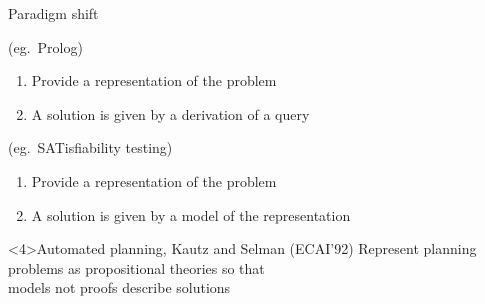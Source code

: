\begin{frame}{Paradigm shift}
  \bigskip

  \begin{description}

  \item<2->[Theorem Proving based approach] (eg.\ Prolog)
    \begin{enumerate}
    \item Provide a representation of the problem

    \item A solution is given by a \alert{derivation} of a query
    \end{enumerate}
    \bigskip

  \item<3->[Model Generation based approach] (eg.\ SATisfiability testing)
    \begin{enumerate}
    \item Provide a representation of the problem

    \item A solution is given by a \alert{model} of the representation
    \end{enumerate}
  \end{description}
  \bigskip
  \begin{block}<4>{Automated planning, Kautz and Selman (ECAI'92)}
      Represent planning problems as propositional theories
      so that\\ models not proofs describe solutions
  \end{block}
\end{frame}
